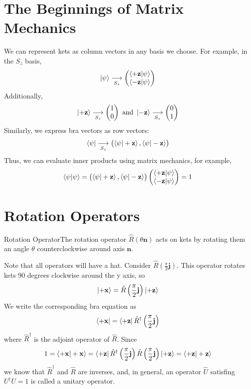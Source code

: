 \documentclass{report}
\newcommand{\dfn}[2]{\begin{Definition}[colbacktitle=red!75!black]{#1}{}#2\end{Definition}}
\begin{document}
\section{The Beginnings of Matrix Mechanics}
We can represent kets as column vectors in any basis we choose. For example, in the \(S_z\) basis, 
\[
\ket{\psi} \underset{S_z}\longrightarrow \begin{pmatrix} \braket{+ \mathbf z | \psi} \\ \braket{- \mathbf z | \psi} \end{pmatrix} 
\] 
Additionally, 
\[
\ket{+ \mathbf z} \underset{S_z}\longrightarrow \begin{pmatrix} 1 \\ 0 \end{pmatrix} \text{ and } \ket{- \mathbf z} \underset{S_z}\longrightarrow \begin{pmatrix} 0 \\ 1 \end{pmatrix} 
\] 
Similarly, we express bra vectors as row vectors:
\[
\bra{\psi} \underset{S_z}\longrightarrow  \begin{pmatrix} 

\braket{\psi | + \mathbf z} , \braket{\psi | -\mathbf z} 
\end{pmatrix} \] 
Thus, we can evaluate inner products using matrix mechanics, for example, 
\[
\braket{\psi | \psi} = \begin{pmatrix} \braket{\psi | + \mathbf z}, \braket{\psi | - \mathbf z} \end{pmatrix} \begin{pmatrix} \braket{+ \mathbf z | \psi} \\ \braket{ - \mathbf z | \psi} \end{pmatrix} = 1
\] 
\section{Rotation Operators}
\dfn{Rotation Operator}{The rotation operator \(\hat R (\theta \mathbf n)\) acts on kets by rotating them an angle \(\theta\) counterclockwise around axis \(\mathbf n\).}
Note that all operators will have a hat. Consider \(\hat R \left( \frac{\pi}{2} \mathbf j\right)\). This operator rotates kets 90 degrees clockwise around the y axis, so
\[
\ket{+ \mathbf x} = \hat R\left(\frac{\pi}{2}\mathbf j\right) \ket{+ \mathbf z}
\] 
We write the corresponding bra equation as
\[
\bra{+ \mathbf x} = \bra{+ \mathbf z}\hat R^ \dag \left(\frac{\pi}{2} \mathbf j\right)
\] 
where \(\hat R^\dag\) is the adjoint operator of \(\hat R\). Since 
\[
1 = \braket{+ \mathbf x | + \mathbf x} = \bra{+ \mathbf z} \hat R^\dag \left(\frac{\pi}{2} \mathbf j \right) \hat R \left(\frac{\pi}{2} \mathbf j \right) \ket{+ \mathbf z} = \braket{+ \mathbf z | + \mathbf z}
\]  
we know that \(\hat R^\dag\) and \(\hat R\) are inverses, and, in general, an operator \(\hat U\) satisfing \(U^\dag U = 1\) is called a unitary operator. 
\end{document}
